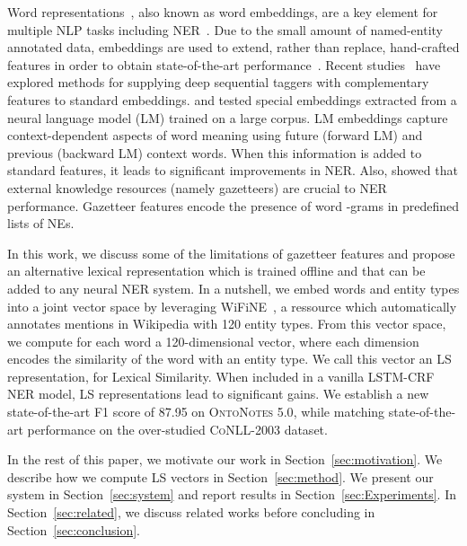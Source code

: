 \documentclass[11pt]{article}
\newcommand{\conll}{\textsc{CoNLL}}
\newcommand{\onto}{\textsc{OntoNotes}}
\newcommand{\lr}{\textsc{LS}}
\newcommand{\wifine}{WiFiNE}
\newcommand{\felipe}[2]{}
\begin{document}
	Word representations~\cite{turian2010word,mikolov2013distributed}, also known as word embeddings, are a key element for multiple NLP tasks including NER~\cite{collobert2011natural}. Due to the small amount of named-entity annotated data, embeddings are used to extend, rather than replace, hand-crafted features in order to obtain state-of-the-art performance~\cite{lample2016neural}. 
	Recent studies~\cite{yang2017neural,sogaard2016deep} have explored methods for supplying deep sequential taggers with complementary features to standard embeddings.  and  tested special embeddings extracted from a neural language model (LM) trained on a large corpus. LM embeddings capture context-dependent aspects of word meaning using future (forward LM) and previous (backward LM) context words. When this information is added to standard features, it leads to significant improvements in NER. 	Also,  showed that external knowledge resources (namely gazetteers) are crucial to NER performance. Gazetteer features encode the presence of word -grams in predefined lists of NEs. 
	
	In this work, we discuss some of the limitations of gazetteer features and propose an alternative lexical representation which is trained offline and that can  be added to any neural NER system. In a nutshell, we embed words and entity types into a joint vector space by leveraging  \wifine~\cite{ghaddara2018wifine}, a ressource which automatically annotates mentions in Wikipedia with 120 entity types. From  this vector space, we compute for each word a  120-dimensional vector, where each dimension encodes the similarity of the word with an entity type. We call this vector an \lr{} representation, for Lexical Similarity. When included in a vanilla LSTM-CRF NER model, \lr{} representations lead to significant gains.  We establish a new state-of-the-art F1 score of  87.95 on \onto{ 5.0}, while matching state-of-the-art performance on the over-studied \conll{-2003} dataset. \felipe{, without making use of LM embeddings as features.}{Unsure this is claim you want to make: because it raises the question: why the hell not?}

	
	In the rest of this paper, we motivate our work in Section~\ref{sec:motivation}. We describe how we compute \lr{} vectors in Section~\ref{sec:method}. We present our system in Section~\ref{sec:system} and report results in Section~\ref{sec:Experiments}. In Section~\ref{sec:related}, we discuss related works before concluding in Section~\ref{sec:conclusion}.
	
\end{document}
